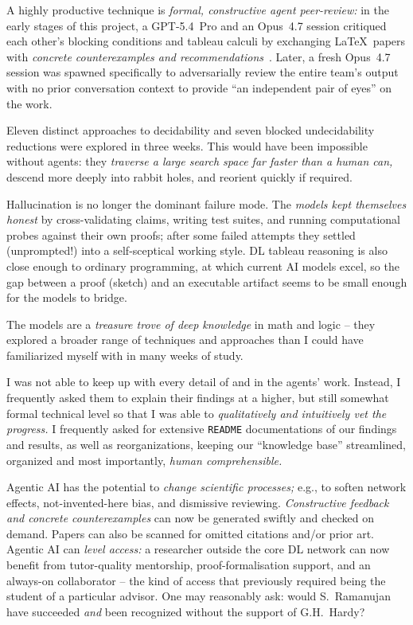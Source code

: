 \documentclass[
]{ceurart}
\theoremstyle{definition}
\begin{document}
A highly productive technique is \emph{formal, constructive agent
peer-review:} in the early stages of this project, a GPT-5.4~Pro and
an Opus~4.7 session critiqued each other's blocking conditions and
tableau calculi by exchanging \LaTeX\ papers with \emph{concrete
counterexamples and
recommendations}~\cite{FWProof,TriangleBlocking,PatchworkAugmentation,
  TypedPatchworkCounterexample,ResponseGPTBlocking,StatusAfterFW}.
Later, a fresh Opus~4.7 session was spawned specifically to
adversarially review the entire team's output with no prior
conversation context to provide ``an independent pair of eyes'' on the
work.
  

Eleven distinct approaches to decidability and seven blocked
undecidability reductions were explored in three weeks. This would
have been impossible without agents: they \emph{traverse a large
search space far faster than a human can,} descend more deeply into
rabbit holes, and reorient quickly if required.

Hallucination is no longer the dominant failure mode. The \emph{models
kept themselves honest} by cross-validating claims, writing test
suites, and running computational probes against their own proofs;
after some failed attempts they settled (unprompted!) into a
self-sceptical working style. DL tableau reasoning is also close
enough to ordinary programming, at which current AI models excel, so
the gap between a proof (sketch) and an executable artifact seems to
be small enough for the models to bridge.

The models are a \emph{treasure trove of deep knowledge} in math and
logic -- they explored a broader range of techniques and approaches
than I could have familiarized myself with in many weeks of study.

I was not able to keep up with every detail of and in the agents'
work. Instead, I frequently asked them to explain their findings at a
higher, but still somewhat formal technical level so that I was able
to \emph{qualitatively and intuitively vet the progress.} I frequently
asked for extensive {\tt README} documentations of our findings and
results, as well as reorganizations, keeping our ``knowledge base''
streamlined, organized and most importantly, \emph{human
comprehensible.}
  
Agentic AI has the potential to \emph{change scientific processes;}
e.g., to soften network effects, not-invented-here bias, and
dismissive reviewing. \emph{Constructive feedback and concrete
counterexamples} can now be generated swiftly and checked on
demand. Papers can also be scanned for omitted citations and/or prior
art. Agentic AI can \emph{level access:} a researcher outside the core DL
network can now benefit from tutor-quality mentorship,
proof-formalisation support, and an always-on collaborator -- the kind
of access that previously required being the student of a particular
advisor. One may reasonably ask: would S.~Ramanujan have succeeded
\emph{and} been recognized without the support of G.H.~Hardy?
                                
\end{document}
